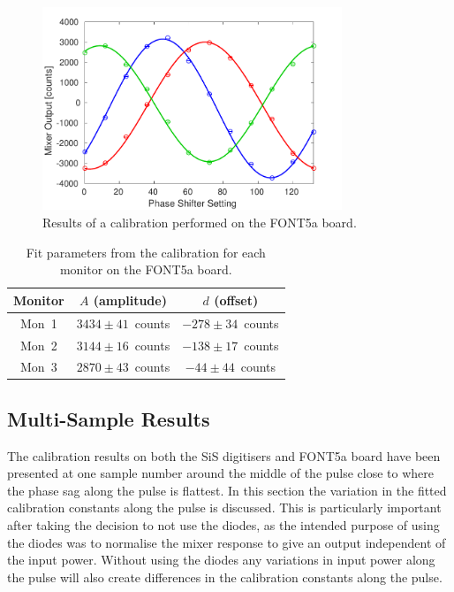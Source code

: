 \begin{figure}
  \centering
  \includegraphics[width=0.8\textwidth]{Figures/phaseMons/calFONT}
  \caption{Results of a calibration performed on the FONT5a board.}
  \label{f:calFONT}
\end{figure}


\begin{table}
  \begin{center}
    \begin{tabular}{|c c c|}
	   \hline
       Monitor & \(A\) (amplitude) & \(d\) (offset) \\ \hline
       Mon~1 & \(3434\pm41\)~counts & \(-278\pm34\)~counts \\ 
       Mon~2 & \(3144\pm16\)~counts & \(-138\pm17\)~counts\\
       Mon~3 & \(2870\pm43\)~counts & \(-44\pm44\)~counts\\ \hline
    \end{tabular}
    \caption{Fit parameters from the calibration for each monitor on the FONT5a board.}
  	\label{t:calFONTConsts}
  \end{center}
\end{table}

\subsection{Multi-Sample Results}
\label{ss:calMultiSamp}

The calibration results on both the SiS digitisers and FONT5a board have been presented at one sample number around the middle of the pulse close to where the phase sag along the pulse is flattest. In this section the variation in the fitted calibration constants along the pulse is discussed. This is particularly important after taking the decision to not use the diodes, as the intended purpose of using the diodes was to normalise the mixer response to give an output independent of the input power. Without using the diodes any variations in input power along the pulse will also create differences in the calibration constants along the pulse. 

